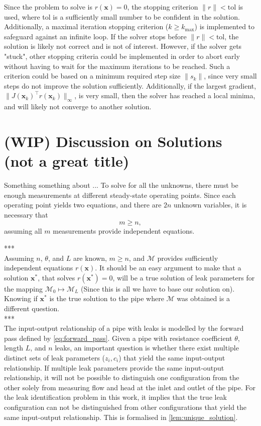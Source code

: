 Since the problem to solve is $r(\mathbf{x})=0$, the stopping criterion $\|r\|< \text{tol}$ is used, where tol is a sufficiently small number to be confident in the solution. Additionally, a maximal iteration stopping criterion ($k \geq k_{\max}$) is implemented to safeguard against an infinite loop. If the solver stops before $\|r\|< \text{tol}$, the solution is likely not correct and is not of interest. However, if the solver gets "stuck", other stopping criteria could be implemented in order to abort early without having to wait for the maximum iterations to be reached. Such a criterion could be based on a minimum required step size $\|s_k\|$, since very small steps do not improve the solution sufficiently. Additionally, if the largest gradient, $\|J(\mathbf{x}_k)^\top r(\mathbf{x}_k)\|_\infty$, is very small, then the solver has reached a local minima, and will likely not converge to another solution.



\section{(WIP) Discussion on Solutions (not a great title)}

Something something about ...
To solve for all the unknowns, there must be enough measurements at different steady-state operating points. Since each operating point yields two equations, and there are $2n$ unknown variables, it is necessary that
\begin{equation*}
    m \geq n,
\end{equation*}
assuming all $m$ measurements provide independent equations.

***\\

Assuming $n$, $\theta$, and $L$ are known, $m \geq n$, and $\mathcal{M}$ provides sufficiently independent equations $r(\mathbf{x})$. It should be an easy argument to make that a solution $\mathbf{x^*}$, that solves $r(\mathbf{x^*})=0$, will be a true solution of leak parameters for the mapping $\mathcal{M}_0 \mapsto \mathcal{M}_L$ (Since this is all we have to base our solution on). Knowing if $\mathbf{x^*}$ is the true solution to the pipe where $\mathcal{M}$ was obtained is a different question.\\

***\\

The input-output relationship of a pipe with leaks is modelled by the forward pass defined by \cref{eq:forward_pass}. Given a pipe with resistance coefficient $\theta$, length $L$, and $n$ leaks, an important question is whether there exist multiple distinct sets of leak parameters ($z_i,c_i$) that yield the same input-output relationship. If multiple leak parameters provide the same input-output relationship, it will not be possible to distinguish one configuration from the other solely from measuring flow and head at the inlet and outlet of the pipe. For the leak identification problem in this work, it implies that the true leak configuration can not be distinguished from other configurations that yield the same input-output relationship. This is formalised in \autoref{lem:unique_solution}. 

